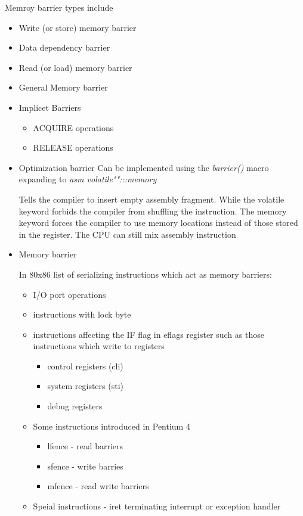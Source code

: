 \documentclass{article}
\begin{document}
Memroy barrier types include
\begin{itemize}
\item Write (or store) memory barrier
\item Data dependency barrier
\item Read (or load) memory barrier
\item General Memory barrier
\item Implicet Barriers
  \begin{itemize}
  \item ACQUIRE operations
  \item RELEASE operations
  \end{itemize}
\end{itemize}


\begin{itemize}

\item{Optimization barrier} Can be implemented using the
  \emph{barrier()} macro expanding to \emph{asm volatile"":::memory}

  Tells the compiler to insert empty assembly fragment. While the
  volatile keyword forbids the compiler from shuffling the
  instruction.  The memory keyword forces the compiler to use memory
  locations instead of those stored in the register. The CPU can still
  mix assembly instruction
  
\item{Memory barrier}

  In 80x86 list of serializing instructions which act as memory
  barriers:


  \begin{itemize}
    \item I/O port operations
    \item instructions with lock byte
    \item instructions affecting the IF flag in eflags register such as those instructions which write to registers
      \begin{itemize}
        \item control registers (cli)
        \item system  registers (sti)
        \item debug   registers          
      \end {itemize}
    \item Some instructions introduced in Pentium 4
      \begin{itemize}
        \item lfence - read barriers
        \item sfence - write barries
        \item mfence - read write barriers
      \end{itemize}
    \item Speial instructions - iret terminating interrupt or exception handler                  
  \end{itemize}
  
\end{itemize}
\end{document}
